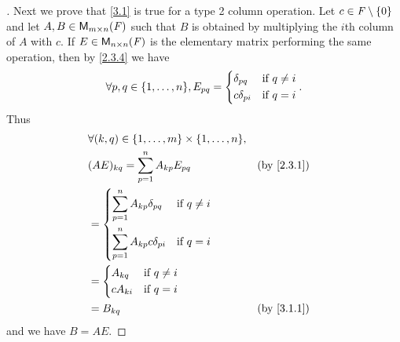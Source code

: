 \begin{proof}[]
  Next we prove that \cref{3.1} is true for a type 2 column operation.
  Let \(c \in \mathit{F} \setminus \left\lbrace0\right\rbrace\) and let \(A, B \in \mathsf{M}_{{m} \times n}({\mathit{F}})\) such that \(B\) is obtained by multiplying the \(i\)th column of \(A\) with \(c\).
  If \(E \in \mathsf{M}_{{n} \times n}({\mathit{F}})\) is the elementary matrix performing the same operation, then by \cref{2.3.4} we have
  \[
    \forall p, q \in \set{1, \dots, n}, E_{p q} = \begin{dcases}
      \delta_{p q}   & \text{if } q \neq i \\
      c \delta_{p i} & \text{if } q = i
    \end{dcases}.
  \]
  Thus
  \begin{align*}
     & \forall (k, q) \in \set{1, \dots, m} \times \set{1, \dots, n},                               \\
     & (AE)_{k q} = \sum_{p = 1}^n A_{k p} E_{p q}                    &  & \text{(by \cref{2.3.1})} \\
     & = \begin{dcases}
           \sum_{p = 1}^n A_{k p} \delta_{p q}   & \text{if } q \neq i \\
           \sum_{p = 1}^n A_{k p} c \delta_{p i} & \text{if } q = i
         \end{dcases}                                \\
     & = \begin{dcases}
           A_{k q}   & \text{if } q \neq i \\
           c A_{k i} & \text{if } q = i
         \end{dcases}                                                            \\
     & = B_{k q}                                                      &  & \text{(by \cref{3.1.1})}
  \end{align*}
  and we have \(B = AE\).


\end{proof}
